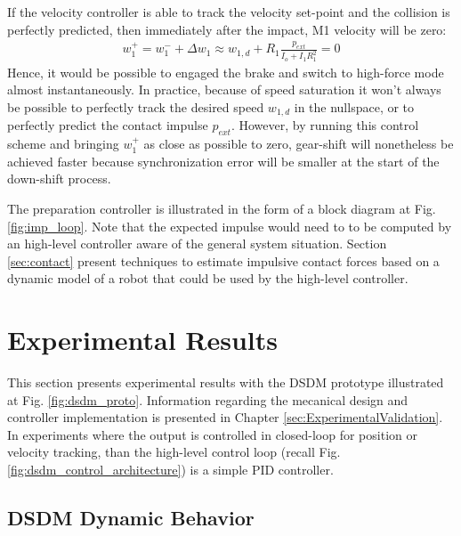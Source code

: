 If the velocity controller is able to track the velocity set-point and the collision is perfectly predicted, then immediately after the impact, M1 velocity will be zero:
%
\begin{align}
w_1^+ =  w_1^- + \Delta w_1 \approx w_{1,d}  + R_1 \frac{ p_{ext} }{I_o + I_1 R_1^2} = 0
\label{eq:dsdm_impact_vel}
\end{align}
%
Hence, it would be possible to engaged the brake and switch to high-force mode almost instantaneously. In practice, because of speed saturation it won't always be possible to perfectly track the desired speed $w_{1,d}$ in the nullspace, or to perfectly predict the contact impulse $p_{ext}$. However, by running this control scheme and bringing $w_1^+$ as close as possible to zero, gear-shift will nonetheless be achieved faster because synchronization error will be smaller at the start of the down-shift process.

The preparation controller is illustrated in the form of a block diagram at Fig. \ref{fig:imp_loop}. Note that the expected impulse would need to to be computed by an high-level controller aware of the general system situation. Section \ref{sec:contact} present techniques to estimate impulsive contact forces based on a dynamic model of a robot that could be used by the high-level controller. 




\newpage

\section{Experimental Results}
\label{sec:dsdm_exp}

This section presents experimental results with the DSDM prototype illustrated at Fig. \ref{fig:dsdm_proto}. Information regarding the mecanical design and controller implementation is presented in Chapter \ref{sec:ExperimentalValidation}. In experiments where the output is controlled in closed-loop for position or velocity tracking, than the high-level control loop (recall Fig. \ref{fig:dsdm_control_architecture}) is a simple PID controller. 

\subsection{DSDM Dynamic Behavior}

